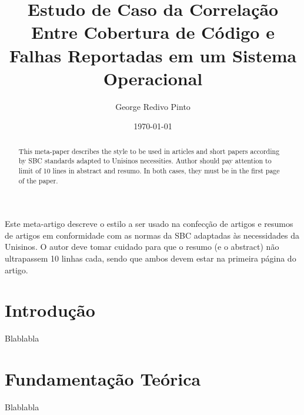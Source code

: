 \documentclass[11.5pt]{article}
\date{\today}
\title{
    Estudo de Caso da Correlação Entre Cobertura de Código e Falhas Reportadas em um Sistema
    Operacional
}
\author{George Redivo Pinto}
\begin{document}
\imprimircapa
\imprimirfolhaderosto

\maketitle

\begin{abstract}

This meta-paper describes the style to be used in articles and short papers according by SBC
standards adapted to Unisinos necessities. Author should pay attention to limit of 10 lines in
abstract and resumo. In both cases, they must be in the first page of the paper.

\end{abstract}

\begin{resumo}

Este meta-artigo descreve o estilo a ser usado na confecção de artigos e resumos de artigos em
conformidade com as normas da SBC adaptadas às necessidades da Unisinos. O autor deve tomar cuidado
para que o resumo (e o abstract) não ultrapassem 10 linhas cada, sendo que ambos devem estar na
primeira página do artigo.

\end{resumo}




\section{Introdução}
Blablabla




\section{Fundamentação Teórica}
Blablabla

\end{document}
